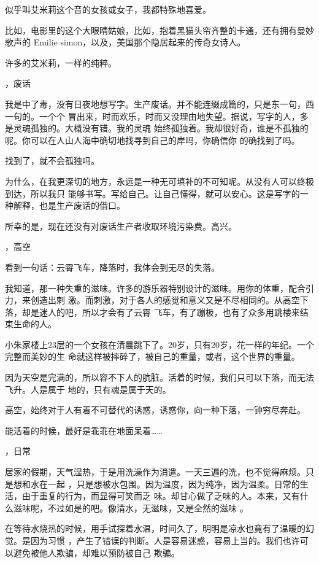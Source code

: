 \documentclass[12pt,a4paper]{article}
\newcommand{\subpart}[1]{
	\begingroup \par
	\vspace{1ex} \centering #1
	\par \endgroup \nopagebreak[4]
}
\begin{document}
		似乎叫艾米莉这个音的女孩或女子，我都特殊地喜爱。

		比如，电影里的这个大眼睛姑娘，比如，抱着黑猫头帘齐整的卡通，还有拥有曼妙歌声的 Emilie
	simon，以及，美国那个隐居起来的传奇女诗人。

		许多的艾米莉，一样的纯粹。


		\subpart{4，废话}

		我是中了毒，没有日夜地想写字。生产废话。并不能连缀成篇的，只是东一句，西一句的。一个个
	冒出来，时而欢乐，时而又没理由地失望。据说，写字的人，多是灵魂孤独的。大概没有错。我的灵魂
	始终孤独着。我却很好奇，谁是不孤独的呢。你可以在人山人海中确切地找寻到自己的岸吗，你确信你
	的确找到了吗。

		找到了，就不会孤独吗。

		为什么，在我更深切的地方，永远是一种无可填补的不可知呢。从没有人可以终极到达，所以我只
	能够书写。写给自己。让自己懂得，就可以安心。这是写字的一种解释，也是生产废话的借口。

		所幸的是，现在还没有对废话生产者收取环境污染费。高兴。


		\subpart{5，高空}

		看到一句话：云霄飞车，降落时，我体会到无尽的失落。

		我知道，那一种失重的滋味。许多的游乐器特别设计的滋味。用你的体重，配合引力，来创造出刺
	激。而刺激，对于各人的感觉和意义又是不尽相同的。从高空下落，却是迷人的吧，所以才会有了云霄
	飞车，有了蹦极，也有了众多用跳楼来结束生命的人。

		小朱家楼上23层的一个女孩在清晨跳下了。20岁，只有20岁，花一样的年纪。一个完整而美妙的生
	命就这样被摔碎了，被自己的重量，或者，这个世界的重量。

		因为天空是完满的，所以容不下人的肮脏。活着的时候，我们只可以下落，而无法飞升。人是属于
	地的，只有魂是属于天的。

		高空，始终对于人有着不可替代的诱惑，诱惑你，向一种下落，一钟穷尽奔赴。

		能活着的时候，最好是乖乖在地面呆着……


		\subpart{6，日常}

		居家的假期，天气湿热，于是用洗澡作为消遣。一天三遍的洗，也不觉得麻烦。只是想和水在一起
	，只是想被水包围。因为温度，因为纯净，因为温柔。日常的生活，由于重复的行为，而显得可笑而乏
	味。却甘心做了乏味的人。本来，又有什么滋味呢，不过如是的吧。像清水，无滋味，又是全然的滋味
	。

		在等待水烧热的时候，用手试探着水温，时间久了，明明是凉水也竟有了温暖的幻觉。是因为习惯
	，产生了错误的判断。人是容易迷惑，容易上当的。我们也许可以避免被他人欺骗，却难以预防被自己
	欺骗。
\end{document}
